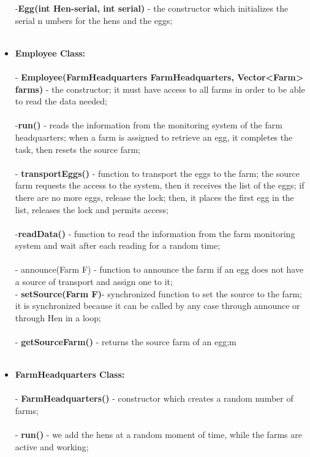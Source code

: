 \documentclass{article}
\begin{document}
\begin{itemize}
-\textbf  {Egg(int Hen-serial, int serial)} - the constructor which initializes the serial n umbers for the hens and the eggs; \\ \\
\item \textbf{Employee Class:}  \\ \\
- \textbf {Employee(FarmHeadquarters FarmHeadquarters, Vector<Farm> farms)} - the constructor; it must have access to all farms in order to be able to read the data needed; \\  \\
-\textbf {run()} - reads the information from the monitoring system of the farm headquarters; when a farm is assigned to retrieve an egg, it completes the task, then resets the source farm; \\  \\
- \textbf {transportEggs()} - function to transport the eggs to the farm; the source farm requests the access to the system, then it receives the list of the eggs; if there are no more eggs, release the lock; then, it places the first egg in the list, releases the lock and permits access; \\  \\
-\textbf {readData()} -  function to read the information from the farm monitoring system and wait after each reading for a random time; \\  \\
- announce(Farm F) - function to announce the farm if an egg does not have a source of transport and assign one to it; \\ 
- \textbf {setSource(Farm F)}- synchronized function to set the source to the farm; it is synchronized because it can be called by any case through announce or through Hen in a loop; \\  \\
- \textbf {getSourceFarm()} - returns the source farm of an egg;m \\ \\
\item \textbf{FarmHeadquarters Class:}  \\ \\
- \textbf {FarmHeadquarters()} - constructor which creates a random number of farms; \\  \\
- \textbf {run()} - we add the hens at a random moment of time, while the farms are active and
 working; \\  \\

\end{itemize}
\end{document}
